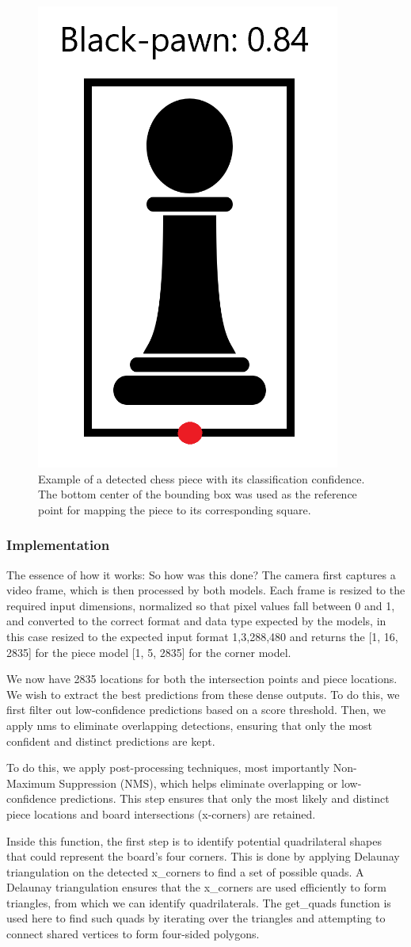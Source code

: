 \newpage

\begin{figure}[h!]
    \centering
    \includegraphics[width=0.25\linewidth]{figures/methods/ml-models/black-pawn.png}
    \caption[FIX]{Example of a detected chess piece with its classification confidence. The bottom center of the bounding box was used as the reference point for mapping the piece to its corresponding square. \cite{svgrepo:black-pawn-svg}}
    \label{fig:bbox-black-pawn}
\end{figure}

\subsubsection*{Implementation}

The essence of how it works:
So how was this done? The camera first captures a video frame, which is then processed by both models. Each frame is resized to the required input dimensions, normalized so that pixel values fall between 0 and 1, and converted to the correct format and data type expected by the models, in this case resized to the expected input format {1,3,288,480} and returns the 
[1, 16, 2835] for the piece model
[1, 5, 2835] for the corner model.

We now have 2835 locations for both the intersection points and piece locations. We wish to extract the best predictions from these dense outputs. To do this, we first filter out low-confidence predictions based on a score threshold. Then, we apply \gls{nms} to eliminate overlapping detections, ensuring that only the most confident and distinct predictions are kept.

To do this, we apply post-processing techniques, most importantly Non-Maximum Suppression (NMS), which helps eliminate overlapping or low-confidence predictions. This step ensures that only the most likely and distinct piece locations and board intersections (x-corners) are retained.

Inside this function, the first step is to identify potential quadrilateral shapes that could represent the board's four corners. This is done by applying Delaunay triangulation on the detected x_corners to find a set of possible quads. A Delaunay triangulation ensures that the x_corners are used efficiently to form triangles, from which we can identify quadrilaterals. The get_quads function is used here to find such quads by iterating over the triangles and attempting to connect shared vertices to form four-sided polygons.

